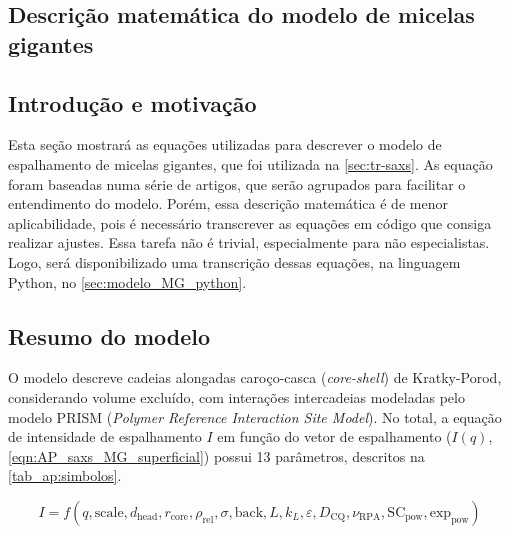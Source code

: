 \begin{apendicesenv}
\partapendices

\chapter{Descrição matemática do modelo de micelas gigantes}
\label{sec:modelo_MG_matematica}
\section{Introdução e motivação}

Esta seção mostrará as equações utilizadas para descrever o modelo de espalhamento de micelas gigantes, que foi utilizada na \autoref{sec:tr-saxs}. As equação foram baseadas numa série de artigos\cite{Pedersen1996, Yoshizaki1980, Cannavacciuolo2002, Pedersen2007a, Arleth2002}, que serão agrupados para facilitar o entendimento do modelo. Porém, essa descrição matemática é de menor aplicabilidade, pois é necessário transcrever as equações em código que consiga realizar ajustes. Essa tarefa não é trivial, especialmente para não especialistas. Logo, será disponibilizado uma transcrição dessas equações, na linguagem Python, no \autoref{sec:modelo_MG_python}.

\section{Resumo do modelo}

O modelo descreve cadeias alongadas caroço-casca (\emph{core-shell}) de Kratky-Porod, considerando volume excluído, com interações intercadeias modeladas pelo modelo PRISM (\emph{Polymer Reference Interaction Site Model}). No total, a equação de intensidade de espalhamento \(I\) em função do vetor de espalhamento \q (\(I(q)\), \autoref{eqn:AP_saxs_MG_superficial}) possui 13 parâmetros, descritos na \autoref{tab_ap:simbolos}.

\begin{equation}
I = f(q, \mathrm{scale}, d_{\mathrm{head}}, r_{\mathrm{core}}, \rho_{\mathrm{rel}}, \sigma, \mathrm{back}, L, k_L, \varepsilon, D_{\mathrm{CQ}}, \nu_{\mathrm{RPA}}, \mathrm{SC}_{\mathrm{pow}}, \mathrm{exp}_{\mathrm{pow}})
\label{eqn:AP_saxs_MG_superficial}
\end{equation}


\end{apendicesenv}
